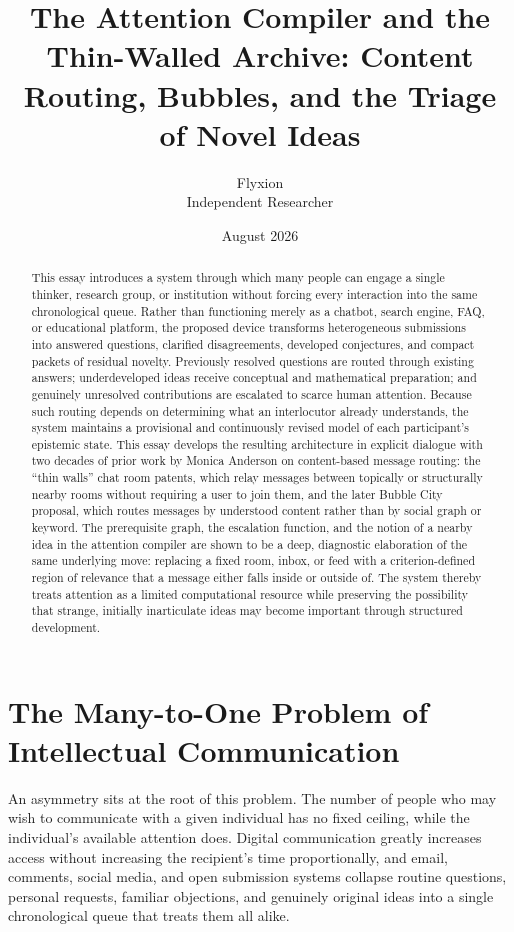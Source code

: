 \documentclass[11pt]{article}
\title{\textbf{The Attention Compiler and the Thin-Walled Archive: Content Routing, Bubbles, and the Triage of Novel Ideas}}
\author{Flyxion \\ \small Independent Researcher}
\date{August 2026}
\begin{document}
\maketitle

\begin{abstract}
This essay introduces a system through which many people can engage a single thinker, research group, or institution without forcing every interaction into the same chronological queue. Rather than functioning merely as a chatbot, search engine, FAQ, or educational platform, the proposed device transforms heterogeneous submissions into answered questions, clarified disagreements, developed conjectures, and compact packets of residual novelty. Previously resolved questions are routed through existing answers; underdeveloped ideas receive conceptual and mathematical preparation; and genuinely unresolved contributions are escalated to scarce human attention. Because such routing depends on determining what an interlocutor already understands, the system maintains a provisional and continuously revised model of each participant's epistemic state. This essay develops the resulting architecture in explicit dialogue with two decades of prior work by Monica Anderson on content-based message routing: the ``thin walls'' chat room patents, which relay messages between topically or structurally nearby rooms without requiring a user to join them, and the later Bubble City proposal, which routes messages by understood content rather than by social graph or keyword. The prerequisite graph, the escalation function, and the notion of a nearby idea in the attention compiler are shown to be a deep, diagnostic elaboration of the same underlying move: replacing a fixed room, inbox, or feed with a criterion-defined region of relevance that a message either falls inside or outside of. The system thereby treats attention as a limited computational resource while preserving the possibility that strange, initially inarticulate ideas may become important through structured development.
\end{abstract}

\section{The Many-to-One Problem of Intellectual Communication}

An asymmetry sits at the root of this problem. The number of people who may wish to communicate with a given individual has no fixed ceiling, while the individual's available attention does. Digital communication greatly increases access without increasing the recipient's time proportionally, and email, comments, social media, and open submission systems collapse routine questions, personal requests, familiar objections, and genuinely original ideas into a single chronological queue that treats them all alike.
\end{document}
